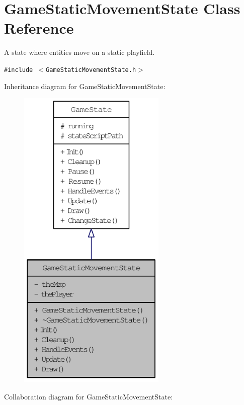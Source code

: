\hypertarget{class_game_static_movement_state}{
\section{GameStaticMovementState Class Reference}
\label{d7/d3b/class_game_static_movement_state}
}
A state where entities move on a static playfield.  


{\tt \#include $<$GameStaticMovementState.h$>$}

Inheritance diagram for GameStaticMovementState:\nopagebreak
\begin{figure}[H]
\begin{center}
\leavevmode
\includegraphics[width=200pt]{d0/d7e/class_game_static_movement_state__inherit__graph}
\end{center}
\end{figure}
Collaboration diagram for GameStaticMovementState:\nopagebreak
